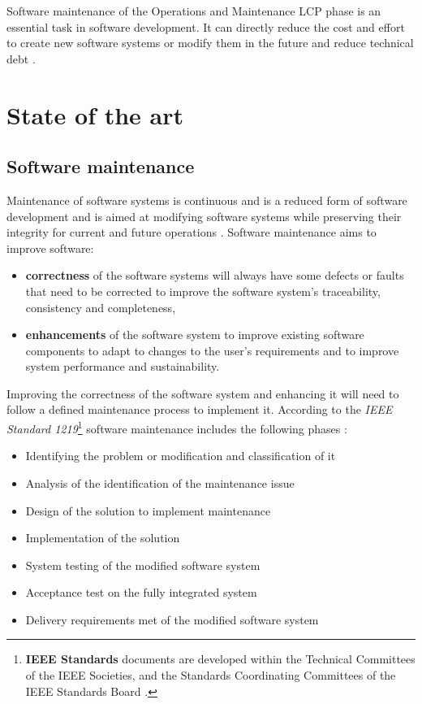 Software maintenance of the Operations and Maintenance LCP phase is an essential task in software development. It can directly reduce the cost and effort to create new software systems or modify them in the future and reduce technical debt \cite{Thamburaj2017, DeLeon-Sigg2020}. 

\clearpage

\section{State of the art}

\subsection{Software maintenance}\label{sec:ch1_softwareMaintenanceIntro}{}
Maintenance of software systems is continuous and is a reduced form of software development and is aimed at modifying software systems while preserving their integrity for current and future operations \cite{Sneed2004, Ackermann2009, Port2017}. Software maintenance aims to improve software:

\begin{itemize}
	\item \textbf{correctness} of the software systems will always have some defects or faults that need to be corrected to improve the software system's traceability, consistency and completeness,
	\item \textbf{enhancements} of the software system to improve existing software components to adapt to changes to the user's requirements and to improve system performance and sustainability. 
\end{itemize}

Improving the correctness of the software system and enhancing it will need to follow a defined maintenance process to implement it. According to the \textit{IEEE Standard 1219}\footnote{\textbf{IEEE Standards} documents are developed within the Technical Committees of the IEEE Societies, and the Standards Coordinating Committees of the IEEE Standards Board \cite{Mamone1994}.} software maintenance includes the following phases \cite{Mamone1994, Hasan2012,Stojanov2017}:
\begin{itemize}
	\item Identifying the problem or modification and classification of it
	\item Analysis of the identification of the maintenance issue
	\item Design of the solution to implement maintenance
	\item Implementation of the solution
	\item System testing of the modified software system
	\item Acceptance test on the fully integrated system
	\item Delivery requirements met of the modified software system
\end{itemize}

